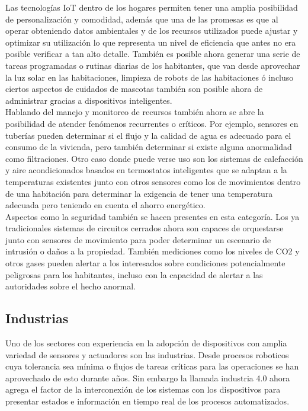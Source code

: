 Las tecnologías IoT dentro de los hogares permiten tener una amplia posibilidad de personalización y comodidad, además que una de las promesas es que al operar obteniendo datos ambientales y de los recursos utilizados puede ajustar y optimizar su utilización lo que representa un nivel de eficiencia que antes no era posible verificar a tan alto detalle. También es posible ahora generar una serie de tareas programadas  o rutinas diarias de los habitantes, que van desde aprovechar la luz solar en las habitaciones, limpieza de robots de las habitaciones ó incluso ciertos aspectos de cuidados de mascotas también son posible ahora de administrar gracias a dispositivos inteligentes.\\

Hablando del manejo y monitoreo de recursos también ahora se abre la posibilidad de atender fenómenos recurrentes o críticos. Por ejemplo, sensores en tuberías pueden determinar si el flujo y la calidad de agua es adecuado para el consumo de la vivienda, pero también determinar si existe alguna anormalidad como filtraciones. Otro caso donde puede verse uso son los sistemas de calefacción y aire acondicionados basados en termostatos inteligentes que se adaptan a la temperaturas existentes junto con otros sensores como los de movimientos dentro de una habitación para determinar la exigencia de tener una temperatura adecuada pero teniendo en cuenta el ahorro energético.\\ 

Aspectos como la seguridad también se hacen presentes en esta categoría. Los ya tradicionales sistemas de circuitos cerrados ahora son capaces de orquestarse junto con sensores de movimiento para poder determinar un escenario de intrusión o daños a la propiedad. También mediciones como los niveles de CO2 y otros gases pueden alertar a los interesados sobre condiciones potencialmente peligrosas para los habitantes, incluso con la capacidad de alertar a las autoridades sobre el hecho anormal. 

\subsection{Industrias}
Uno de los sectores con experiencia en la adopción de dispositivos con amplia variedad de sensores y actuadores son las industrias. Desde procesos roboticos cuya tolerancia sea mínima o flujos de tareas críticas para las operaciones  se han aprovechado de esto durante años. Sin embargo la llamada industria 4.0 ahora agrega el factor de la interconexión de los sistemas con los dispositivos para presentar estados e información en tiempo real de los procesos automatizados.\\

